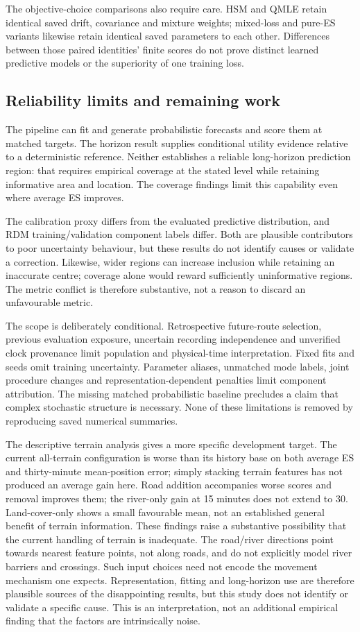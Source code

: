 The objective-choice comparisons also require care. HSM and QMLE retain
identical saved drift, covariance and mixture weights; mixed-loss and
pure-ES variants likewise retain identical saved parameters to each other.
Differences between those paired identities' finite scores do not prove
distinct learned predictive models or the superiority of one training loss.

\subsection{Reliability limits and remaining work}
The pipeline can fit and generate probabilistic forecasts and score them
at matched targets. The horizon result supplies conditional utility
evidence relative to a deterministic reference. Neither establishes a
reliable long-horizon prediction region: that requires empirical coverage
at the stated level while retaining informative area and location.
The coverage findings limit this capability even where average ES improves.

The calibration proxy differs from the evaluated predictive distribution,
and RDM training/validation component labels differ. Both are plausible
contributors to poor uncertainty behaviour, but these results do not
identify causes or validate a correction. Likewise, wider regions can
increase inclusion while retaining an inaccurate centre; coverage alone
would reward sufficiently uninformative regions. The metric conflict is
therefore substantive, not a reason to discard an unfavourable metric.

The scope is deliberately conditional. Retrospective future-route selection,
previous evaluation exposure, uncertain recording independence and unverified
clock provenance limit population and physical-time interpretation. Fixed
fits and seeds omit training uncertainty. Parameter aliases, unmatched
mode labels, joint procedure changes and representation-dependent penalties
limit component attribution. The missing matched probabilistic baseline
precludes a claim that complex stochastic structure is necessary. None of
these limitations is removed by reproducing saved numerical summaries.

The descriptive terrain analysis gives a more specific development target.
The current all-terrain configuration is worse than its history base on
both average ES and thirty-minute mean-position error; simply stacking
terrain features has not produced an average gain here. Road addition
accompanies worse scores and removal improves them; the river-only gain
at 15 minutes does not extend to 30. Land-cover-only shows a small favourable
mean, not an established general benefit of terrain information.
These findings raise a substantive possibility that the current handling
of terrain is inadequate. The road/river directions point towards nearest
feature points, not along roads, and do not explicitly model river
barriers and crossings. Such input choices need not encode the movement
mechanism one expects. Representation, fitting and long-horizon use are
therefore plausible sources of the disappointing results, but this study
does not identify or validate a specific cause. This is an interpretation,
not an additional empirical finding that the factors are intrinsically noise.

